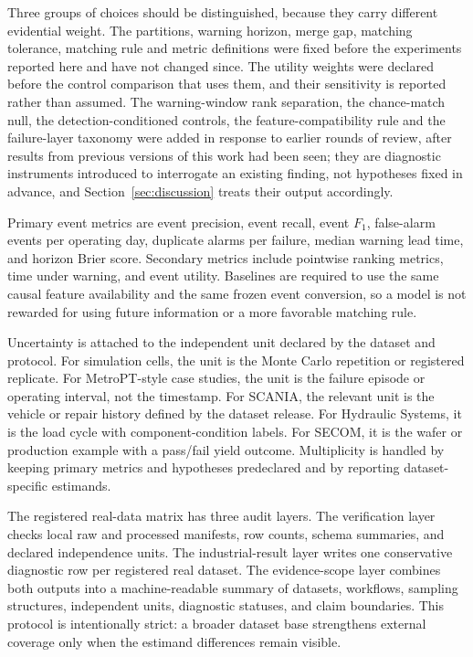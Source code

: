 Three groups of choices should be distinguished, because they carry different evidential weight. The partitions, warning horizon, merge gap, matching tolerance, matching rule and metric definitions were fixed before the experiments reported here and have not changed since. The utility weights were declared before the control comparison that uses them, and their sensitivity is reported rather than assumed. The warning-window rank separation, the chance-match null, the detection-conditioned controls, the feature-compatibility rule and the failure-layer taxonomy were added in response to earlier rounds of review, after results from previous versions of this work had been seen; they are diagnostic instruments introduced to interrogate an existing finding, not hypotheses fixed in advance, and Section~\ref{sec:discussion} treats their output accordingly.

Primary event metrics are event precision, event recall, event \(F_1\), false-alarm events per operating day, duplicate alarms per failure, median warning lead time, and horizon Brier score. Secondary metrics include pointwise ranking metrics, time under warning, and event utility. Baselines are required to use the same causal feature availability and the same frozen event conversion, so a model is not rewarded for using future information or a more favorable matching rule.

Uncertainty is attached to the independent unit declared by the dataset and protocol. For simulation cells, the unit is the Monte Carlo repetition or registered replicate. For MetroPT-style case studies, the unit is the failure episode or operating interval, not the timestamp. For SCANIA, the relevant unit is the vehicle or repair history defined by the dataset release. For Hydraulic Systems, it is the load cycle with component-condition labels. For SECOM, it is the wafer or production example with a pass/fail yield outcome. Multiplicity is handled by keeping primary metrics and hypotheses predeclared and by reporting dataset-specific estimands.

The registered real-data matrix has three audit layers. The verification layer checks local raw and processed manifests, row counts, schema summaries, and declared independence units. The industrial-result layer writes one conservative diagnostic row per registered real dataset. The evidence-scope layer combines both outputs into a machine-readable summary of datasets, workflows, sampling structures, independent units, diagnostic statuses, and claim boundaries. This protocol is intentionally strict: a broader dataset base strengthens external coverage only when the estimand differences remain visible.
